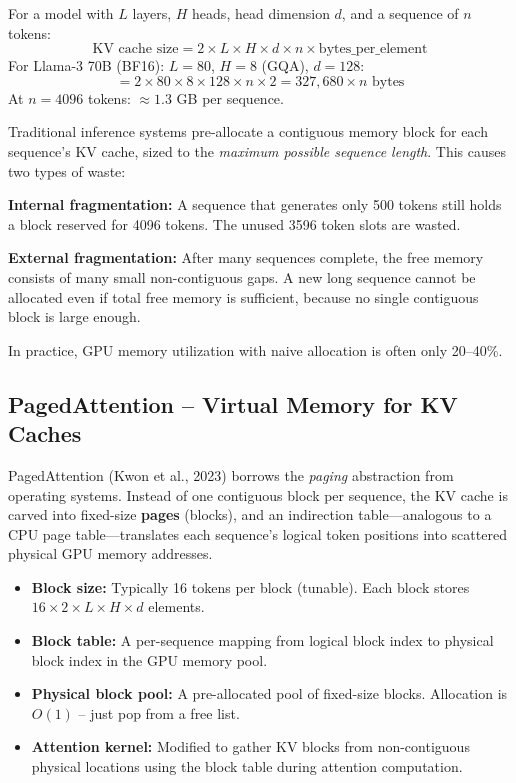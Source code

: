 \begin{keybox}
For a model with $L$ layers, $H$ heads, head dimension $d$, and a sequence of $n$ tokens: 
\[
\text{KV cache size} = 2 \times L \times H \times d \times n \times \text{bytes\_per\_element}
\]
 For Llama-3 70B (BF16): $L=80$, $H=8$ (GQA), $d=128$: 
\[
= 2 \times 80 \times 8 \times 128 \times n \times 2 = 327{,}680 \times n \text{ bytes}
\]
 At $n=4096$ tokens: $\approx 1.3$ GB per sequence.
\end{keybox}

\begin{intuitionbox}
Traditional inference systems pre-allocate a contiguous memory block for each sequence’s KV cache, sized to the \emph{maximum possible sequence length}. This causes two types of waste:

\textbf{Internal fragmentation:} A sequence that generates only 500 tokens still holds a block reserved for 4096 tokens. The unused 3596 token slots are wasted.

\textbf{External fragmentation:} After many sequences complete, the free memory consists of many small non-contiguous gaps. A new long sequence cannot be allocated even if total free memory is sufficient, because no single contiguous block is large enough.

In practice, GPU memory utilization with naive allocation is often only 20--40\%.
\end{intuitionbox}

\subsection{PagedAttention -- Virtual Memory for KV Caches}
\label{pagedattention-virtual-memory-for-kv-caches}

PagedAttention (Kwon et al., 2023) borrows the \emph{paging} abstraction from operating systems. Instead of one contiguous block per sequence, the KV cache is carved into fixed-size \textbf{pages} (blocks), and an indirection table---analogous to a CPU page table---translates each sequence’s logical token positions into scattered physical GPU memory addresses.

\begin{keybox}
\begin{itemize}
  \item \textbf{Block size:} Typically 16 tokens per block (tunable). Each block stores $16 \times 2 \times L \times H \times d$ elements.
  \item \textbf{Block table:} A per-sequence mapping from logical block index to physical block index in the GPU memory pool.
  \item \textbf{Physical block pool:} A pre-allocated pool of fixed-size blocks. Allocation is $O(1)$ -- just pop from a free list.
  \item \textbf{Attention kernel:} Modified to gather KV blocks from non-contiguous physical locations using the block table during attention computation.
\end{itemize}
\end{keybox}

